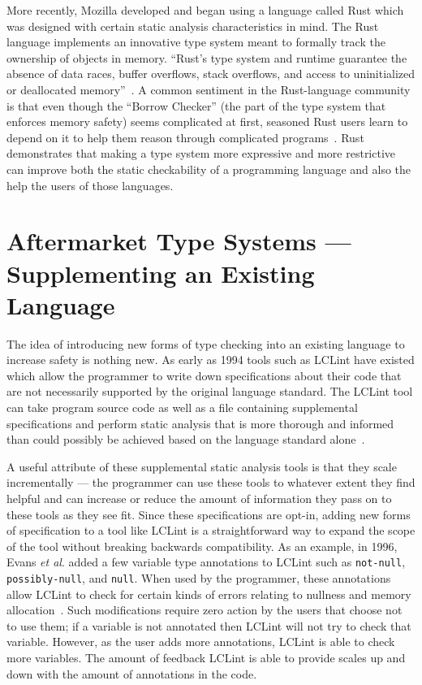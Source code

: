 More recently, Mozilla developed and began using a language called Rust which was designed with certain static analysis characteristics in mind.  The Rust language implements an innovative type system meant to formally track the ownership of objects in memory.  ``Rust's type system and runtime guarantee the absence of data races, buffer overflows, stack overflows, and access to uninitialized or deallocated memory''~\cite{rust-is-dope}.  A common sentiment in the Rust-language community is that even though the ``Borrow Checker'' (the part of the type system that enforces memory safety) seems complicated at first, seasoned Rust users learn to depend on it to help them reason through complicated programs~\cite{rust-lang-spec}.  Rust demonstrates that making a type system more expressive and more restrictive can improve both the static checkability of a programming language and also the help the users of those languages.  

\section{Aftermarket Type Systems --- Supplementing an Existing Language}\label{sec:related:aftermarket}

The idea of introducing new forms of type checking into an existing language to increase safety is nothing new.  As early as 1994 tools such as LCLint have existed which allow the programmer to write down specifications about their code that are not necessarily supported by the original language standard.  The LCLint tool can take program source code as well as a file containing supplemental specifications and perform static analysis that is more thorough and informed than could possibly be achieved based on the language standard alone~\cite{lclint-og}. 

A useful attribute of these supplemental static analysis tools is that they scale incrementally --- the programmer can use these tools to whatever extent they find helpful and can increase or reduce the amount of information they pass on to these tools as they see fit.  Since these specifications are opt-in, adding new forms of specification to a tool like LCLint is a straightforward way to expand the scope of the tool without breaking backwards compatibility.  As an example, in 1996, Evans \textit{et al}. added a few variable type annotations to LCLint such as \lstinline{not-null}, \lstinline{possibly-null}, and \lstinline{null}.  When used by the programmer, these annotations allow LCLint to check for certain kinds of errors relating to nullness and memory allocation~\cite{lclint-memory}.  Such modifications require zero action by the users that choose not to use them; if a variable is not annotated then LCLint will not try to check that variable.  However, as the user adds more annotations, LCLint is able to check more variables.  The amount of feedback LCLint is able to provide scales up and down with the amount of annotations in the code.  

